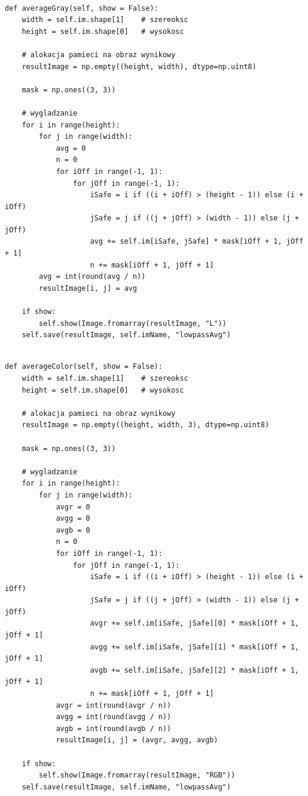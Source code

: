 \documentclass[final,a4paper,openany,12pt]{mwbk}
\begin{document}

\begin{lstlisting}[caption=Filtr dolnoprzepustowy uśredniający (obraz szary)]

def averageGray(self, show = False):
	width = self.im.shape[1]    # szereoksc
	height = self.im.shape[0]   # wysokosc
	
	# alokacja pamieci na obraz wynikowy
	resultImage = np.empty((height, width), dtype=np.uint8)

	mask = np.ones((3, 3))      
	
	# wygladzanie
	for i in range(height):
		for j in range(width):
			avg = 0
			n = 0
			for iOff in range(-1, 1):
				for jOff in range(-1, 1):
					iSafe = i if ((i + iOff) > (height - 1)) else (i + iOff)
					jSafe = j if ((j + jOff) > (width - 1)) else (j + jOff)
					avg += self.im[iSafe, jSafe] * mask[iOff + 1, jOff + 1]
					n += mask[iOff + 1, jOff + 1]
		avg = int(round(avg / n))
		resultImage[i, j] = avg
	
	if show:
		self.show(Image.fromarray(resultImage, "L"))
	self.save(resultImage, self.imName, "lowpassAvg")

\end{lstlisting}

\newpage



\begin{lstlisting}[caption=Filtr dolnoprzepustowy uśredniający (obraz barwny)]
	
def averageColor(self, show = False):
	width = self.im.shape[1]    # szereoksc
	height = self.im.shape[0]   # wysokosc
	
	# alokacja pamieci na obraz wynikowy
	resultImage = np.empty((height, width, 3), dtype=np.uint8)

	mask = np.ones((3, 3))      

	# wygladzanie
	for i in range(height):
		for j in range(width):
			avgr = 0
			avgg = 0
			avgb = 0
			n = 0
			for iOff in range(-1, 1):
				for jOff in range(-1, 1):
					iSafe = i if ((i + iOff) > (height - 1)) else (i + iOff)
					jSafe = j if ((j + jOff) > (width - 1)) else (j + jOff)
					avgr += self.im[iSafe, jSafe][0] * mask[iOff + 1, jOff + 1]
					avgg += self.im[iSafe, jSafe][1] * mask[iOff + 1, jOff + 1]
					avgb += self.im[iSafe, jSafe][2] * mask[iOff + 1, jOff + 1]
					n += mask[iOff + 1, jOff + 1]
			avgr = int(round(avgr / n))
			avgg = int(round(avgg / n))
			avgb = int(round(avgb / n))
			resultImage[i, j] = (avgr, avgg, avgb)
			
	if show:
		self.show(Image.fromarray(resultImage, "RGB"))
	self.save(resultImage, self.imName, "lowpassAvg")
	
\end{lstlisting}
\end{document}
